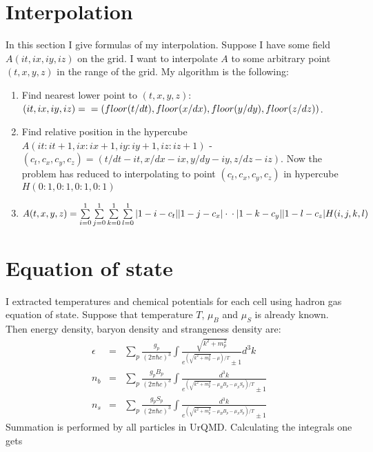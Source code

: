 \documentclass[12pt,a4paper]{report}
\begin{document}
\section{Interpolation}

In this section I give formulas of my interpolation. Suppose I have some field $A(it,ix,iy,iz)$ on the grid. I want to interpolate $A$ to some arbitrary point $(t,x,y,z)$ in the range of the grid. My algorithm is the following:
\begin{enumerate}
\item Find nearest lower point to $(t,x,y,z)$: $(it,ix,iy,iz) = \\ =(floor(t/dt),floor(x/dx), floor(y/dy), floor(z/dz))$.
\item Find relative position in the hypercube $A(it:it+1,ix:ix+1,iy:iy+1,iz:iz+1)$ - $(c_t,c_x,c_y,c_z) = (t/dt - it, x/dx - ix, y/dy - iy, z/dz -iz)$. Now the problem has reduced to interpolating to point $(c_t,c_x,c_y,c_z)$ in hypercube $H(0:1,0:1,0:1,0:1)$
\item $A(t,x,y,z) = \sum\limits_{i=0}^{1} \sum\limits_{j=0}^{1} \sum\limits_{k=0}^{1} \sum\limits_{l=0}^{1} |1-i-c_t| |1-j-c_x| \cdot \\ \cdot |1-k-c_y| |1-l-c_z| H(i,j,k,l)$
\end{enumerate}

\section{Equation of state}

I extracted temperatures and chemical potentials for each cell using hadron gas equation of state. Suppose that temperature $T$, $\mu_B$ and $\mu_S$ is already known. Then energy density, baryon density and strangeness density are:
\begin{eqnarray}
\epsilon &=& \sum_p \frac{g_p}{(2\pi \hbar c)^3} \int 
             \frac{\sqrt{k^2 +m_p^2}}{e^{(\sqrt{k^2 + m_p^2}-\mu)/T} \pm 1}  d^3k  \\
n_b &=&  \sum_p \frac{g_p B_p}{(2\pi \hbar c)^3} \int 
             \frac{d^3k }{e^{(\sqrt{k^2 + m_p^2}-\mu_B B_p  - \mu_S S_p)/T} \pm 1} \\
n_s &=&  \sum_p \frac{g_p S_p}{(2\pi \hbar c)^3} \int 
             \frac{d^3k }{e^{(\sqrt{k^2 + m_p^2}- \mu_B B_p  - \mu_S S_p)/T} \pm 1}             
\end{eqnarray}
Summation is performed by all particles in UrQMD. Calculating the integrals one gets
\end{document}
